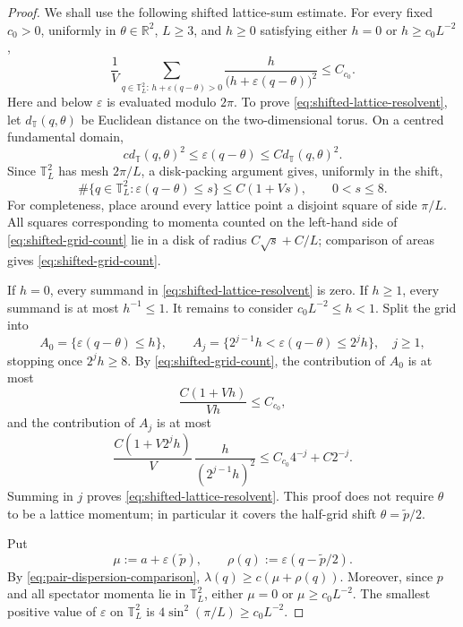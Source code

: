 \documentclass[10pt,a4paper]{amsart}
\begin{document}
\begin{proof}
We shall use the following shifted lattice-sum estimate.  For every fixed
\(c_0>0\), uniformly in \(\theta\in\mathbb R^2\), \(L\geq3\), and
\(h\geq0\) satisfying either \(h=0\) or \(h\geq c_0L^{-2}\),
\begin{equation}
 \frac1V\sum_{q\in\mathbb T_L^2:\,h+\varepsilon(q-\theta)>0}
 \frac{h}{\bigl(h+\varepsilon(q-\theta)\bigr)^2}
 \leq C_{c_0}.
 \label{eq:shifted-lattice-resolvent}
\end{equation}
Here and below \(\varepsilon\) is evaluated modulo \(2\pi\).  To prove
\eqref{eq:shifted-lattice-resolvent}, let
\(d_{\mathbb T}(q,\theta)\) be Euclidean distance on the two-dimensional
torus.  On a centred fundamental domain,
\[
 c d_{\mathbb T}(q,\theta)^2
 \leq\varepsilon(q-\theta)
 \leq C d_{\mathbb T}(q,\theta)^2.
\]
Since \(\mathbb T_L^2\) has mesh \(2\pi/L\), a disk-packing argument gives,
uniformly in the shift,
\begin{equation}
 \#\{q\in\mathbb T_L^2:\varepsilon(q-\theta)\leq s\}
 \leq C(1+Vs),\qquad 0<s\leq8.
 \label{eq:shifted-grid-count}
\end{equation}
For completeness, place around every lattice point a disjoint square of
side \(\pi/L\).  All squares corresponding to momenta counted on the
left-hand side of \eqref{eq:shifted-grid-count} lie in a disk of radius
\(C\sqrt{s}+C/L\); comparison of areas gives
\eqref{eq:shifted-grid-count}.

If \(h=0\), every summand in \eqref{eq:shifted-lattice-resolvent} is zero.
If \(h\geq1\), every summand is at most \(h^{-1}\leq1\).  It remains to
consider \(c_0L^{-2}\leq h<1\).  Split the grid into
\[
 A_0=\{\varepsilon(q-\theta)\leq h\},\qquad
 A_j=\{2^{j-1}h<\varepsilon(q-\theta)\leq2^jh\},\quad j\geq1,
\]
stopping once \(2^jh\geq8\).  By \eqref{eq:shifted-grid-count}, the
contribution of \(A_0\) is at most
\[
 \frac{C(1+Vh)}{Vh}\leq C_{c_0},
\]
and the contribution of \(A_j\) is at most
\[
 \frac{C(1+V2^jh)}{V}\,
 \frac{h}{(2^{j-1}h)^2}
 \leq C_{c_0}4^{-j}+C2^{-j}.
\]
Summing in \(j\) proves \eqref{eq:shifted-lattice-resolvent}.  This proof
does not require \(\theta\) to be a lattice momentum; in particular it
covers the half-grid shift \(\theta=\widetilde p/2\).

Put
\[
 \mu:=a+\varepsilon(\widetilde p),\qquad
 \rho(q):=\varepsilon(q-\widetilde p/2).
\]
By \eqref{eq:pair-dispersion-comparison},
\(\lambda(q)\geq c(\mu+\rho(q))\).  Moreover, since \(p\) and all
spectator momenta lie in \(\mathbb T_L^2\), either \(\mu=0\) or
\(\mu\geq c_0L^{-2}\).  The smallest positive value of
\(\varepsilon\) on \(\mathbb T_L^2\) is
\(4\sin^2(\pi/L)\geq c_0L^{-2}\).


\end{proof}
\end{document}
